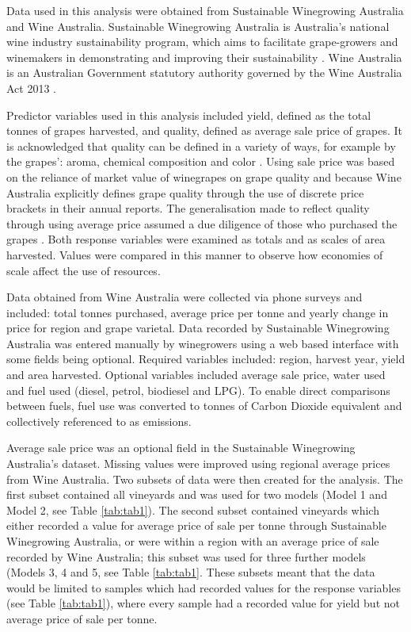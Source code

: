 \documentclass[review,12pt,authoryear]{elsarticle}
\begin{document}
\begin{linenumbers}
Data used in this analysis were obtained from Sustainable Winegrowing Australia and Wine Australia. Sustainable Winegrowing Australia is Australia's national wine industry sustainability program, which aims to facilitate grape-growers and winemakers in demonstrating and improving their sustainability \citep{swaSustainableWingrowingAustralia2022}. Wine Australia is an Australian Government statutory authority governed by the Wine Australia Act 2013 \citep{WineAustraliaAct2019}.
\par
Predictor variables used in this analysis included yield, defined as the total tonnes of grapes harvested, and quality, defined as average sale price of grapes. It is acknowledged that quality can be defined in a variety of ways, for example by the grapes': aroma, chemical composition and color \citep{kasimatiPredictingGrapeSugar2022,mejeanperrotDecisionsupportSystemPredict2022,suarezAssessingWineGrape2021}. Using sale price was based on the reliance of market value of winegrapes on grape quality and because Wine Australia explicitly defines grape quality through the use of discrete price brackets in their annual reports. The generalisation made to reflect quality through using average price assumed a due diligence of those who purchased the grapes \citep{yeggeInfluenceSensoryNonsensory2001}. Both response variables were examined as totals and as scales of area harvested. Values were compared in this manner to observe how economies of scale affect the use of resources.
\par
Data obtained from Wine Australia were collected via phone surveys and included: total tonnes purchased, average price per tonne and yearly change in price for region and grape varietal. Data recorded by Sustainable Winegrowing Australia was entered manually by winegrowers using a web based interface with some fields being optional. Required variables included: region, harvest year, yield and area harvested. Optional variables included average sale price, water used and fuel used (diesel, petrol, biodiesel and LPG). To enable direct comparisons between fuels, fuel use was converted to tonnes of Carbon Dioxide equivalent and collectively referenced to as emissions.
\par
Average sale price was an optional field in the Sustainable Winegrowing Australia's dataset. 
Missing values were improved using regional average prices from Wine Australia. Two subsets of data were then created for the analysis. The first subset contained all vineyards and was used for two models (Model 1 and Model 2, see Table \ref{tab:tab1}). The second subset contained vineyards which either recorded a value for average price of sale per tonne through Sustainable Winegrowing Australia, or were within a region with an average price of sale recorded by Wine Australia; this subset was used for three further models (Models 3, 4 and 5, see Table \ref{tab:tab1}. These subsets meant that the data would be limited to samples which had recorded values for the response variables (see Table \ref{tab:tab1}), where every sample had a recorded value for yield but not average price of sale per tonne.

\end{linenumbers}
\end{document}
